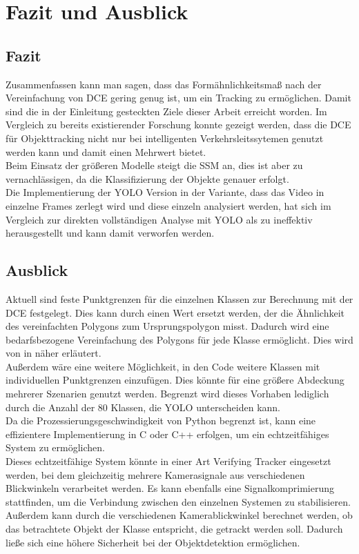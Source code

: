 \chapter{Fazit und Ausblick}
\label{ch:conclusion}
\section{Fazit}
{ 
    Zusammenfassen kann man sagen, dass das Formähnlichkeitsmaß nach der Vereinfachung von DCE gering genug ist, um ein Tracking zu ermöglichen. Damit sind die in der Einleitung gesteckten Ziele dieser Arbeit erreicht worden. Im Vergleich zu bereits existierender Forschung konnte gezeigt werden, dass die DCE für Objekttracking nicht nur bei intelligenten Verkehrsleitssytemen genutzt werden kann und damit einen Mehrwert bietet. \\
	Beim Einsatz der größeren Modelle steigt die SSM an, dies ist aber zu vernachlässigen, da die Klassifizierung der Objekte genauer erfolgt.  \\
	Die Implementierung der YOLO Version in der Variante, dass das Video in einzelne Frames zerlegt wird und diese einzeln analysiert werden, hat sich im Vergleich zur direkten vollständigen Analyse mit YOLO als zu ineffektiv herausgestellt und kann damit verworfen werden.

    }
\section{Ausblick}
{
	Aktuell sind feste Punktgrenzen für die einzelnen Klassen zur Berechnung mit der DCE festgelegt. Dies kann durch einen Wert ersetzt werden, der die Ähnlichkeit des vereinfachten Polygons zum Ursprungspolygon misst. Dadurch wird eine bedarfsbezogene Vereinfachung des Polygons für jede Klasse ermöglicht. Dies wird von \citeauthor{Latecki2003} in  \citep{Latecki2003} näher erläutert. \\
	Außerdem wäre eine weitere Möglichkeit, in den Code weitere Klassen mit individuellen Punktgrenzen einzufügen. Dies könnte für eine größere Abdeckung mehrerer Szenarien genutzt werden. Begrenzt wird dieses Vorhaben lediglich durch die Anzahl der 80 Klassen, die YOLO unterscheiden kann. \\
	Da die Prozessierungsgeschwindigkeit von Python begrenzt ist, kann eine effizientere Implementierung in C oder C++ erfolgen, um ein echtzeitfähiges System zu ermöglichen. \\
	Dieses echtzeitfähige System könnte in einer Art \glqq Verifying Tracker\grqq{} eingesetzt werden, bei dem gleichzeitig mehrere Kamerasignale aus verschiedenen Blickwinkeln verarbeitet werden. Es kann ebenfalls eine Signalkomprimierung stattfinden, um die Verbindung zwischen den einzelnen Systemen zu stabilisieren.  Außerdem kann durch die verschiedenen Kamerablickwinkel berechnet werden, ob das betrachtete Objekt der Klasse entspricht, die getrackt werden soll. Dadurch ließe sich eine höhere Sicherheit bei der Objektdetektion ermöglichen. 

}

